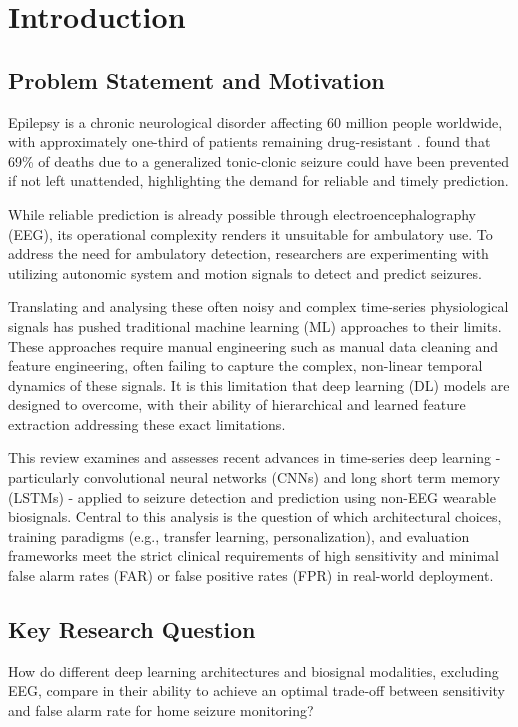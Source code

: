 \section{Introduction}

\subsection{Problem Statement and Motivation}

Epilepsy is a chronic neurological disorder affecting 60 million people worldwide,
with approximately one-third of patients remaining drug-resistant \parencite{husseinFocalNonFocalEpilepsy2018}.
\textcite{sveinssonClinicalRiskFactors2020} found that 69\% of deaths due to a generalized
tonic-clonic seizure could have been prevented if not left unattended, highlighting the demand
for reliable and timely prediction.

While reliable prediction is already possible through electroencephalography (EEG),
its operational complexity renders it unsuitable for ambulatory use.
To address the need for ambulatory detection, researchers are experimenting with
utilizing autonomic system and motion signals to detect and predict seizures.

Translating and analysing these often noisy and complex time-series physiological
signals has pushed traditional machine learning (ML) approaches to their limits.
These approaches require manual engineering such as manual data cleaning and feature engineering,
often failing to capture the complex, non-linear temporal dynamics of these
signals. It is this limitation that deep learning (DL) models are designed to overcome, with their ability of hierarchical and learned feature
extraction addressing these exact limitations.

This review examines and assesses recent advances in time-series
deep learning - particularly convolutional neural networks (CNNs)
and long short term memory (LSTMs) -
applied to seizure detection and prediction using non-EEG wearable biosignals.
Central to this analysis is the question of which architectural choices, training paradigms
(e.g., transfer learning, personalization), and evaluation frameworks
meet the strict clinical requirements of high sensitivity
and minimal false alarm rates (FAR) or false positive rates (FPR) in real-world deployment.

\subsection{Key Research Question}
How do different deep learning architectures and biosignal modalities, excluding EEG,
compare in their ability to achieve an optimal trade-off between
sensitivity and false alarm rate for home seizure monitoring?

